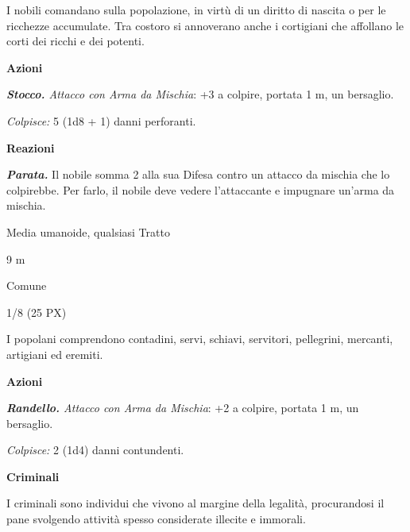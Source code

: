 \begin{multicols}{2}
{I nobili comandano sulla popolazione, in virtù di un diritto di nascita o per le ricchezze accumulate. Tra costoro si annoverano anche i cortigiani che affollano le corti dei ricchi e dei potenti.

\textbf{Azioni}

\emph{\textbf{Stocco.} Attacco con Arma da Mischia}: +3 a colpire, portata 1 m, un bersaglio.

\emph{Colpisce:} 5 (1d8 + 1) danni perforanti.

\textbf{Reazioni}

\emph{\textbf{Parata.}} Il nobile somma 2 alla sua Difesa contro un attacco da mischia che lo colpirebbe. Per farlo, il nobile deve vedere l'attaccante e impugnare un'arma da mischia.

\begin{description}[noitemsep, topsep=0pt, parsep=0pt, partopsep=0pt, itemsep=1pt, leftmargin=2.35cm,  labelwidth=2.2cm, itemindent=0cm, listparindent=0pt] %
\setlength{\baselineskip}{10pt}
\item[\textbf{Taglia/Tipo}] Media umanoide, qualsiasi Tratto
\item[\textbf{Caratt.}] 
\item[\textbf{Punti Ferita}] 
\item[\textbf{Tiri Salvez.}] 
\item[\textbf{Movimento}] 9 m
\item[\textbf{Linguaggi}] Comune
\item[\textbf{Sfida}] 1/8 (25 PX)
\end{description}
\smallskip

I popolani comprendono contadini, servi, schiavi, servitori, pellegrini, mercanti, artigiani ed eremiti.

\textbf{Azioni}

\emph{\textbf{Randello.} Attacco con Arma da Mischia}: +2 a colpire, portata 1 m, un bersaglio.

\emph{Colpisce:} 2 (1d4) danni contundenti.

\medskip\textbf{Criminali}

I criminali sono individui che vivono al margine della legalità, procurandosi il pane svolgendo attività spesso considerate illecite e immorali.

}
\end{multicols}
